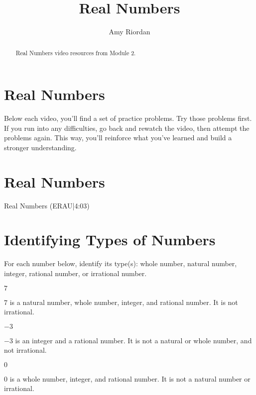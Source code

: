 \documentclass{ximera}
\title{Real Numbers}
\author{Amy Riordan}
\begin{document}
\begin{abstract}
Real Numbers video resources from Module 2.
\end{abstract}
\maketitle

\section*{Real Numbers}

Below each video, you’ll find a set of practice problems. Try those problems first. If you run into any difficulties, go back and rewatch the video, then attempt the problems again. This way, you’ll reinforce what you’ve learned and build a stronger understanding.

\section*{Real Numbers}

Real Numbers (ERAU|4:03)

\section*{Identifying Types of Numbers}

For each number below, identify its type(s): whole number, natural number, integer, rational number, or irrational number.

\begin{problem}
$7$

\begin{feedback}
$7$ is a natural number, whole number, integer, and rational number. It is not irrational.
\end{feedback}
\end{problem}

\begin{problem}
$-3$

\begin{feedback}
$-3$ is an integer and a rational number. It is not a natural or whole number, and not irrational.
\end{feedback}
\end{problem}

\begin{problem}
$0$

\begin{feedback}
$0$ is a whole number, integer, and rational number. It is not a natural number or irrational.
\end{feedback}
\end{problem}
\end{document}
